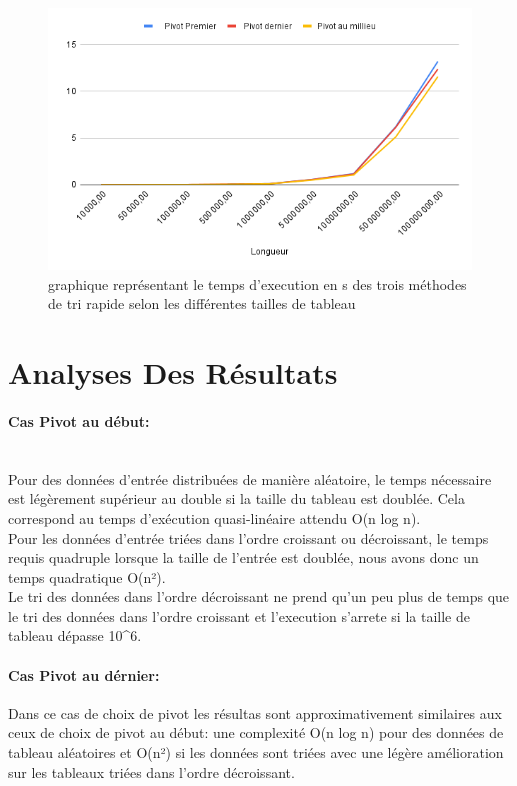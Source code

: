 \begin{figure}[H]
    \centering
        \includegraphics[scale=0.7]{ressources/random.png}
        \caption{graphique représentant le temps d'execution en s des trois méthodes de tri rapide selon les différentes tailles de tableau}
    \label{fig:fusion}
\end{figure}
\section{Analyses Des Résultats}
\paragraph{Cas Pivot au début:} \\
Pour des données d'entrée distribuées de manière aléatoire, le temps nécessaire est légèrement supérieur au double si la taille du tableau est doublée. Cela correspond au temps d'exécution quasi-linéaire attendu O(n log n).\\
Pour les données d'entrée triées dans l'ordre croissant ou décroissant, le temps requis quadruple lorsque la taille de l'entrée est doublée, nous avons donc un temps quadratique O(n²).\\
Le tri des données dans l'ordre décroissant ne prend qu'un peu plus de temps que le tri des données dans l'ordre croissant et l'execution s'arrete si la taille de tableau dépasse 10^6.
\paragraph{Cas Pivot au dérnier:} 
Dans ce cas de choix de pivot les résultas sont approximativement similaires aux ceux de choix de pivot au début: une complexité O(n log n) pour des données de tableau  aléatoires et O(n²) si les données sont triées avec une légère amélioration sur les tableaux triées dans l'ordre décroissant.\\
